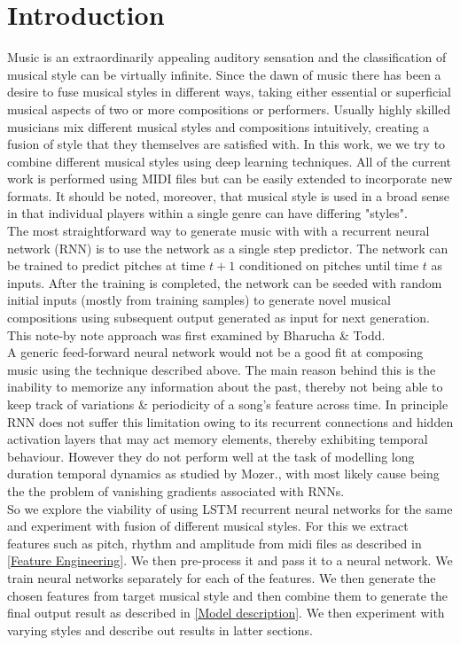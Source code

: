 \documentclass[conference]{IEEEtran}
\begin{document}
\section{Introduction}
Music is an extraordinarily appealing auditory sensation and the classification of musical style can be virtually infinite. Since the dawn of music there has been a desire to fuse musical styles in different ways, taking either essential or superficial musical aspects of two or more compositions or performers. Usually highly skilled musicians mix different musical styles and compositions intuitively, creating a fusion of style that they themselves are satisfied with. In this work, we we try to combine different musical styles using deep learning techniques. All of the current work is performed using MIDI files but can be easily extended to incorporate new formats. It should be noted, moreover, that musical style is used in a broad sense in that individual players within a single genre can have differing "styles".\\

The most straightforward way to generate music with with a recurrent neural network (RNN) is to use the network as a single step predictor. The network can be trained to predict pitches at time $t+1$ conditioned on pitches until time $t$ as inputs. After the training is completed, the network can be seeded with random initial inputs (mostly from training samples) to generate novel musical compositions using subsequent output generated as input for next generation. This note-by note approach was first examined by Bharucha \& Todd.\cite{todd,eck}\\

A generic feed-forward neural network would not be a good fit at composing music using the technique described above. The main reason behind this is the inability to memorize any information about the past, thereby not being able to keep track of variations \& periodicity of a song's  feature across time. In principle RNN does not suffer this limitation owing to its recurrent connections and hidden activation layers that may act memory elements, thereby exhibiting temporal behaviour. However they do not perform well at the task of modelling long duration temporal dynamics as studied by Mozer.\cite{mozer}, with most likely cause being the the problem of vanishing gradients associated with RNNs.\cite{hochreiter}\\

So we explore the viability of using LSTM recurrent neural networks for the same and experiment with fusion of different musical styles. For this we extract features such as pitch, rhythm and amplitude from midi files as described in \ref{Feature Engineering}. We then pre-process it and pass it to a neural network. We train neural networks separately for each of the features. We then generate the chosen features from target musical style and then combine them to generate the final output result as described in \ref{Model description}. We then experiment with varying styles and describe out results in latter sections.
\end{document}
